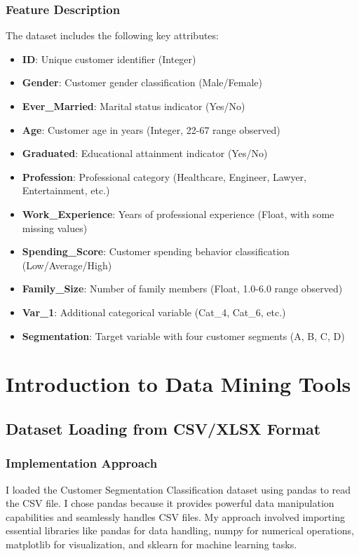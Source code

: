 \documentclass[12pt,a4paper]{article}
\begin{document}
\subsubsection{Feature Description}

The dataset includes the following key attributes:

\begin{itemize}
    \item \textbf{ID}: Unique customer identifier (Integer)
    \item \textbf{Gender}: Customer gender classification (Male/Female)
    \item \textbf{Ever\_Married}: Marital status indicator (Yes/No)
    \item \textbf{Age}: Customer age in years (Integer, 22-67 range observed)
    \item \textbf{Graduated}: Educational attainment indicator (Yes/No)
    \item \textbf{Profession}: Professional category (Healthcare, Engineer, Lawyer, Entertainment, etc.)
    \item \textbf{Work\_Experience}: Years of professional experience (Float, with some missing values)
    \item \textbf{Spending\_Score}: Customer spending behavior classification (Low/Average/High)
    \item \textbf{Family\_Size}: Number of family members (Float, 1.0-6.0 range observed)
    \item \textbf{Var\_1}: Additional categorical variable (Cat\_4, Cat\_6, etc.)
    \item \textbf{Segmentation}: Target variable with four customer segments (A, B, C, D)
\end{itemize}

\section{Introduction to Data Mining Tools}

\subsection{Dataset Loading from CSV/XLSX Format}

\subsubsection{Implementation Approach}
I loaded the Customer Segmentation Classification dataset using pandas to read the CSV file. I chose pandas because it provides powerful data manipulation capabilities and seamlessly handles CSV files. My approach involved importing essential libraries like pandas for data handling, numpy for numerical operations, matplotlib for visualization, and sklearn for machine learning tasks. 
\end{document}
